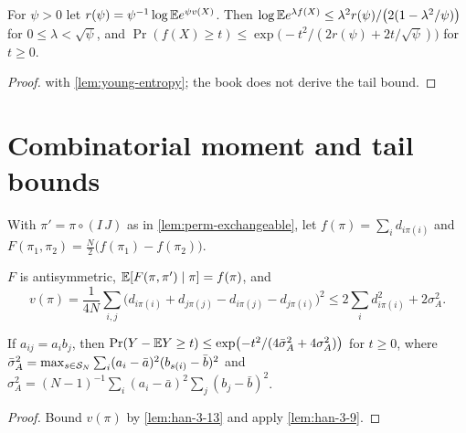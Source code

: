 \begin{lemma}
  \label{lem:han-3-11}
  For $\psi>0$ let $r(\psi)=\psi^{-1}\log\mathbb{E} e^{\psi v(X)}$. Then $\log\mathbb{E} e^{\lambda f(X)}\le\lambda^2r(\psi)/\bigl(2(1-\lambda^2/\psi)\bigr)$ for $0\le\lambda<\sqrt\psi$, and $\Pr(f(X)\ge t)\le\exp\bigl(-t^2/(2r(\psi)+2t/\sqrt\psi)\bigr)$ for $t\ge0$.
\end{lemma}
\begin{proof}
   with \cref{lem:young-entropy}; the book does not derive the tail bound.
\end{proof}

\section{Combinatorial moment and tail bounds}

\begin{definition}
  \label{def:perm-chatterjee}
  With $\pi'=\pi\circ(I\,J)$ as in \cref{lem:perm-exchangeable}, let $f(\pi)=\sum_id_{i\pi(i)}$ and $F(\pi_1,\pi_2)=\frac N2\bigl(f(\pi_1)-f(\pi_2)\bigr)$.
\end{definition}

\begin{lemma}
  \label{lem:han-3-13}
  $F$ is antisymmetric, $\mathbb{E}[F(\pi,\pi')\mid\pi]=f(\pi)$, and
  \[
    v(\pi)=\frac1{4N}\sum_{i,j}\bigl(d_{i\pi(i)}+d_{j\pi(j)}-d_{i\pi(j)}-d_{j\pi(i)}\bigr)^2\le2\sum_id_{i\pi(i)}^2+2\sigma_A^2.
  \]
\end{lemma}

\begin{theorem}
  \label{thm:han-3-6}
  If $a_{ij}=a_ib_j$, then $\Pr(Y-\mathbb{E} Y\ge t)\le\exp\bigl(-t^2/(4\bar\sigma_A^2+4\sigma_A^2)\bigr)$ for $t\ge0$, where $\bar\sigma_A^2=\max_{s\in\mathcal{S}_N}\sum_i(a_i-\bar a)^2(b_{s(i)}-\bar b)^2$ and $\sigma_A^2=(N-1)^{-1}\sum_i(a_i-\bar a)^2\sum_j(b_j-\bar b)^2$.
\end{theorem}
\begin{proof}
  Bound $v(\pi)$ by \cref{lem:han-3-13} and apply \cref{lem:han-3-9}.
\end{proof}

